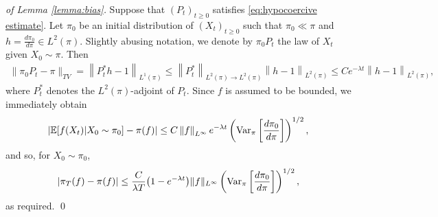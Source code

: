 
\begin{proof}[of Lemma \ref{lemma:bias}]
Suppose that $(P_t)_{t \ge 0}$ satisfies \eqref{eq:hypocoercive estimate}.  Let $\pi_0$ be an initial distribution of $(X_t)_{t \ge 0}$ such that $\pi_0 \ll \pi$ and $h = \frac{d\pi_0}{d\pi} \in L^2(\pi)$.  Slightly abusing notation, we denote by $\pi_0 P_t$ the law of $X_t$ given $X_0 \sim \pi$.  Then
\begin{align*}
	\lVert \pi_0 P_t - \pi \rVert_{TV} = \left\lVert P_t^* h - 1 \right\rVert_{L^1(\pi)} \leq \left\lVert P_t^* \right\rVert_{L^2(\pi)\rightarrow L^2(\pi)} \left\lVert h - 1 \right\rVert_{L^2(\pi)} \leq Ce^{-\lambda t}\left\lVert h - 1 \right\rVert_{L^2(\pi)},
\end{align*}
where $P_t^*$ denotes the $L^2(\pi)$-adjoint of $P_t$.  Since $f$ is assumed to be bounded, we immediately obtain
$$
  \left|{\mathbb{E}[f(X_t) | X_0 \sim \pi_0] - \pi(f)}\right| \leq C\left\lVert{f}\right\rVert_{L^\infty}e^{-\lambda t}\left(\mbox{Var}_{\pi}\left[\frac{d\pi_0}{d\pi}\right]\right)^{1/2},
$$
and so, for $X_0 \sim \pi_0$,
$$
	\left|{\pi_T(f) - \pi(f)}\right| \leq \frac{C}{\lambda T}{\left(1 - e^{-\lambda t}\right)}\lVert f \rVert_{L^\infty}\left(\mbox{Var}_{\pi}\left[\frac{d\pi_0}{d\pi}\right]\right)^{1/2},
$$
as required.
  \qed 
\end{proof}

